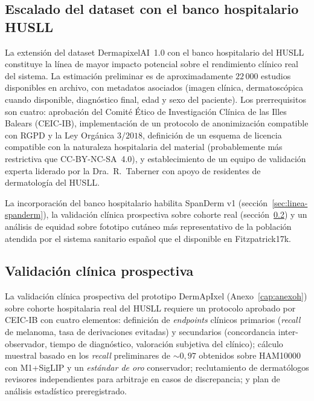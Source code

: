 \subsection{Escalado del dataset con el banco hospitalario HUSLL}
\label{sec:linea-husll}

La extensión del dataset DermapixelAI~1.0 con el banco hospitalario
del HUSLL constituye la línea de mayor impacto potencial sobre el
rendimiento clínico real del sistema. La estimación preliminar es
de aproximadamente $22\,000$ estudios disponibles en archivo,
con metadatos asociados (imagen clínica, dermatoscópica cuando
disponible, diagnóstico final, edad y sexo del paciente). Los
prerrequisitos son cuatro: aprobación del Comité Ético de
Investigación Clínica de las Illes Balears (CEIC-IB),
implementación de un protocolo de anonimización compatible con
RGPD y la Ley Orgánica $3/2018$, definición de un esquema de
licencia compatible con la naturaleza hospitalaria del material
(probablemente más restrictiva que CC-BY-NC-SA~4.0), y
establecimiento de un equipo de validación experta liderado por la
Dra.~R.~Taberner con apoyo de residentes de dermatología del HUSLL.

La incorporación del banco hospitalario habilita SpanDerm v1
(secci\'on~\ref{sec:linea-spanderm}), la validación clínica prospectiva
sobre cohorte real (secci\'on~\ref{sec:linea-prospectivo}) y un análisis
de equidad sobre fototipo cutáneo más representativo de la
población atendida por el sistema sanitario español que el
disponible en Fitzpatrick17k.

\subsection{Validación clínica prospectiva}
\label{sec:linea-prospectivo}

La validación clínica prospectiva del prototipo DermApIxel
(Anexo~\ref{cap:anexoh}) sobre cohorte hospitalaria real
del HUSLL requiere un protocolo aprobado por CEIC-IB con cuatro
elementos: definición de \emph{endpoints} clínicos primarios
(\emph{recall} de melanoma, tasa de derivaciones evitadas) y
secundarios (concordancia inter-observador, tiempo de
diagnóstico, valoración subjetiva del clínico); cálculo
muestral basado en los \emph{recall} preliminares de
$\sim 0{,}97$ obtenidos sobre HAM10000 con M1+SigLIP y un
\emph{estándar de oro} conservador; reclutamiento de dermatólogos
revisores independientes para arbitraje en casos de discrepancia;
y plan de análisis estadístico preregistrado.

